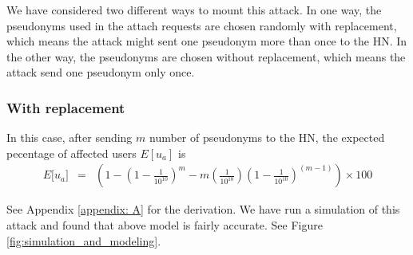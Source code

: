 \documentclass{llncs} %
\begin{document}
We have considered two different ways to mount this attack. In one way, the pseudonyms used in the attach requests are chosen randomly with replacement, which means the attack might sent one pseudonym more than once to the HN. In the other way, the pseudonyms are chosen without replacement, which means the attack send one pseudonym only once.

\subsubsection{With replacement}
In this case, after sending $m$ number of pseudonyms to the HN, the expected pecentage of affected users $E[u_a]$ is
\begin{eqnarray}
E\big[ u_a \big] &=& \left(1- \left(1 - \frac{1}{10^{10}}\right)^m - m\left(\frac{1}{10^{10}}\right)\left(1 - \frac{1}{10^{10}}\right)^{\left(m-1 \right)} \right) \times 100 \label{eqn:avg_with_replacement}
\end{eqnarray} 

See Appendix \ref{appendix: A} for the derivation. We have run a simulation of this attack and found that above model is fairly accurate. See Figure \ref{fig:simulation_and_modeling}.
\end{document}
